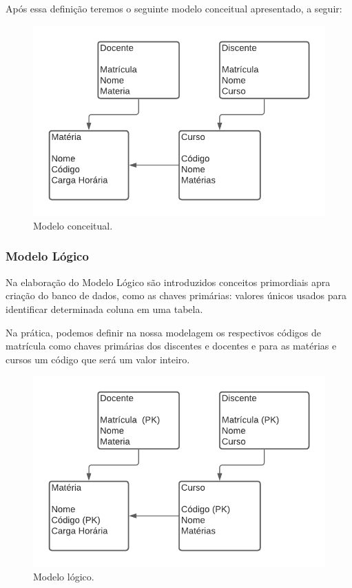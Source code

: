 \documentclass[12pt]{article}
\begin{document}
Após essa definição teremos o seguinte modelo conceitual apresentado, a seguir:
\begin{figure}[ht]
\centering
\includegraphics[width=1\textwidth]{Modelo_Conceitual.png}
\caption{Modelo conceitual.}
\label{fig:ModeloConceitual}
\end{figure}

\subsubsection{Modelo Lógico}

Na elaboração do Modelo Lógico são introduzidos conceitos primordiais apra criação do banco de dados, como as chaves primárias: valores únicos usados para identificar determinada coluna em uma tabela.

Na prática, podemos definir na nossa modelagem os respectivos códigos de matrícula como chaves primárias dos discentes e docentes e para as matérias e cursos um código que será um valor inteiro. 

\begin{figure}[ht]
\centering
\includegraphics[width=.8\textwidth]{Modelo_Logico.png}
\caption{Modelo lógico.}
\label{fig:ModeLogico}
\end{figure}
\end{document}
